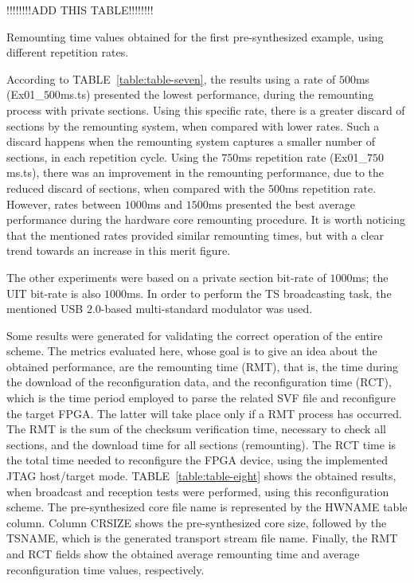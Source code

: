 \begin{table}[ht]
\renewcommand{\arraystretch}{1}
\footnotesize{ !!!!!!!!ADD THIS TABLE!!!!!!!! }
\caption{Remounting time values obtained for the first pre-synthesized example, using different repetition rates.}
\label{table:table-seven}
\end{table}


According to TABLE~\ref{table:table-seven}, the results using a rate of $500$ms (Ex01\_$500$ms.ts) presented the lowest performance, during the remounting process with private sections. Using this specific rate, there is a greater discard of sections by the remounting system, when compared with lower rates. Such a discard happens when the remounting system captures a smaller number of sections, in each repetition cycle. Using the $750$ms repetition rate (Ex01\_$750$ms.ts), there was an improvement in the remounting performance, due to the reduced discard of sections, when compared with the $500$ms repetition rate. However, rates between $1000$ms and $1500$ms presented the best average performance during the hardware core remounting procedure. It is worth noticing that the mentioned rates provided similar remounting times, but with a clear trend towards an increase in this merit figure.

The other experiments were based on a private section bit-rate of $1000$ms; the UIT bit-rate is also $1000$ms. In order to perform the TS broadcasting task, the mentioned USB $2.0$-based multi-standard modulator was used.

Some results were generated for validating the correct operation of the entire scheme. The metrics evaluated here, whose goal is to give an idea about the obtained performance, are the remounting time (RMT), that is, the time during the download of the reconfiguration data, and the reconfiguration time (RCT), which is the time period employed to parse the related SVF file and reconfigure the target FPGA. The latter will take place only if a RMT process has occurred. The RMT is the sum of the checksum verification time, necessary to check all sections, and the download time for all sections (remounting). The RCT time is the total time needed to reconfigure the FPGA device, using the implemented JTAG host/target mode. TABLE~\ref{table:table-eight} shows the obtained results, when broadcast and reception tests were performed, using this reconfiguration scheme. The pre-synthesized core file name is represented by the HWNAME table column. Column CRSIZE shows the pre-synthesized core size, followed by the TSNAME, which is the generated transport stream file name. Finally, the RMT and RCT fields show the obtained average remounting time and average reconfiguration time values, respectively.

